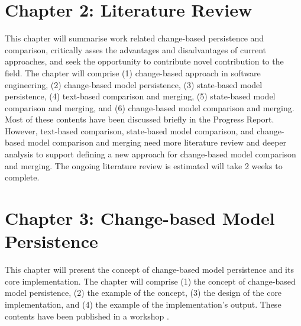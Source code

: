 \documentclass[12pt, a4paper]{report} \usepackage[titletoc]{appendix}
\begin{document}

\section{Chapter 2: Literature Review}
\label{sec:chapter_2_literature_review_plan}
This chapter will summarise work related change-based persistence and comparison, critically asses the advantages and disadvantages of current approaches, and seek the opportunity to contribute novel contribution to the field. The chapter will comprise (1) change-based approach in software engineering, (2) change-based model persistence, (3) state-based model persistence, (4) text-based comparison and merging, (5) state-based model comparison and merging, and (6) change-based model comparison and merging. Most of these contents have been discussed briefly in the Progress Report. However, text-based comparison, state-based model comparison, and change-based model comparison and merging need more literature review and deeper analysis to support defining a new approach for change-based model comparison and merging. The ongoing literature review is estimated will take 2 weeks to complete. 


\section{Chapter 3: Change-based Model Persistence}
\label{sec:chapter_3_Change-based_model_ersistence_plan}
This chapter will present the concept of change-based model persistence and its core implementation. The chapter will comprise (1) the concept of change-based model persistence, (2) the example of the concept, (3) the design of the core implementation, and (4) the example of the implementation's output. These contents have been published in a workshop \cite{DBLP:conf/models/YohannisKP17}.
\end{document}
